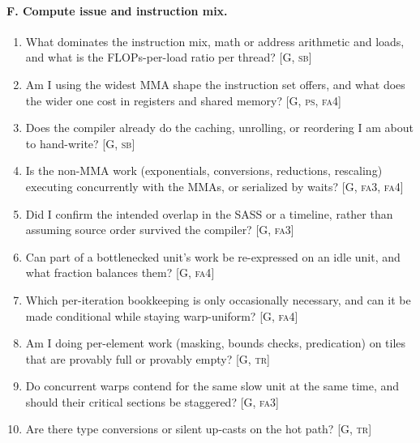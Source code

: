 \paragraph{F. Compute issue and instruction mix.}
\begin{enumerate}[nosep,leftmargin=*,resume]
\item What dominates the instruction mix, math or address arithmetic and loads, and what is the FLOPs-per-load ratio per thread? [G, \textsc{sb}]
\item Am I using the widest MMA shape the instruction set offers, and what does the wider one cost in registers and shared memory? [G, \textsc{ps}, \textsc{fa4}]
\item Does the compiler already do the caching, unrolling, or reordering I am about to hand-write? [G, \textsc{sb}]
\item Is the non-MMA work (exponentials, conversions, reductions, rescaling) executing concurrently with the MMAs, or serialized by waits? [G, \textsc{fa3}, \textsc{fa4}]
\item Did I confirm the intended overlap in the SASS or a timeline, rather than assuming source order survived the compiler? [G, \textsc{fa3}]
\item Can part of a bottlenecked unit's work be re-expressed on an idle unit, and what fraction balances them? [G, \textsc{fa4}]
\item Which per-iteration bookkeeping is only occasionally necessary, and can it be made conditional while staying warp-uniform? [G, \textsc{fa4}]
\item Am I doing per-element work (masking, bounds checks, predication) on tiles that are provably full or provably empty? [G, \textsc{tr}]
\item Do concurrent warps contend for the same slow unit at the same time, and should their critical sections be staggered? [G, \textsc{fa3}]
\item Are there type conversions or silent up-casts on the hot path? [G, \textsc{tr}]
\end{enumerate}

